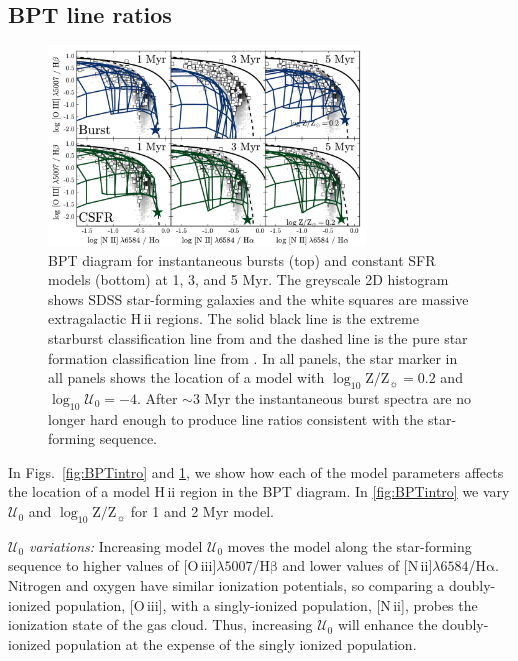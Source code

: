 \documentclass[linenumbers, trackchanges, tighten]{aastex61}%
\newcommand{\Fig}[1]{\autoref{fig:#1}}
\newcommand{\logten}{\ensuremath{\log_{10}}}
\newcommand{\nii}{[N\,{\sc ii}]\xspace}
\newcommand{\oiii}{[O\,{\sc iii}]\xspace}
\newcommand{\ha}{\ensuremath{\mathrm{H\alpha}}}
\newcommand{\hb}{\ensuremath{\mathrm{H\beta}}}
\newcommand{\hii}{H\,{\sc ii}\xspace}
\newcommand\lam[1]{\ensuremath{\lambda #1}}
\newcommand{\logz}{\ensuremath{\logten \mathrm{Z}/\mathrm{Z}_{\sun}}}
\newcommand{\logZeq}[1]{\ensuremath{\logten \mathrm{Z}/\mathrm{Z}_{\sun} = #1}}
\newcommand{\U}{\ensuremath{\mathcal{U}_{0}}}
\newcommand{\logU}{\ensuremath{\logten \mathcal{U}_0}}
\newcommand\niiha{\nii{}\lam{6584}/\ha{}}
\newcommand\oiiihb{\oiii{}\lam{5007}/\hb{}}
\begin{document}
\subsection{BPT line ratios}\label{sec:models:diagnostics:BPT}
\begin{figure}[!htbp]
    \begin{centering}
        \includegraphics[width=0.75\textwidth]{f17.pdf}
        \caption{BPT diagram for instantaneous bursts (top) and constant SFR models (bottom) at 1, 3, and 5 Myr. The greyscale 2D histogram shows SDSS star-forming galaxies and the white squares are massive extragalactic \hii regions. The solid black line is the extreme starburst classification line from \citet{Kewley01} and the dashed line is the pure star formation classification line from \citet{Kauffmann03a}. In all panels, the star marker in all panels shows the location of a model with \logZeq{0.2} and $\logU=-4$. After $\sim3$ Myr the instantaneous burst spectra are no longer hard enough to produce line ratios consistent with the star-forming sequence.}
        \label{fig:BPTage}
    \end{centering}
\end{figure}

In Figs.~\ref{fig:BPTintro} and \ref{fig:BPTage}, we show how each of the model parameters affects the location of a model \hii region in the BPT diagram. In \Fig{BPTintro} we vary \U{} and \logz{} for 1 and 2 Myr model.

{\it \U{} variations:} Increasing model \U{} moves the model along the star-forming sequence to higher values of \oiiihb{} and lower values of \niiha{}. Nitrogen and oxygen have similar ionization potentials, so comparing a doubly-ionized population, \oiii{}, with a singly-ionized population, \nii{}, probes the ionization state of the gas cloud. Thus, increasing \U{} will enhance the doubly-ionized population at the expense of the singly ionized population.
\end{document}
